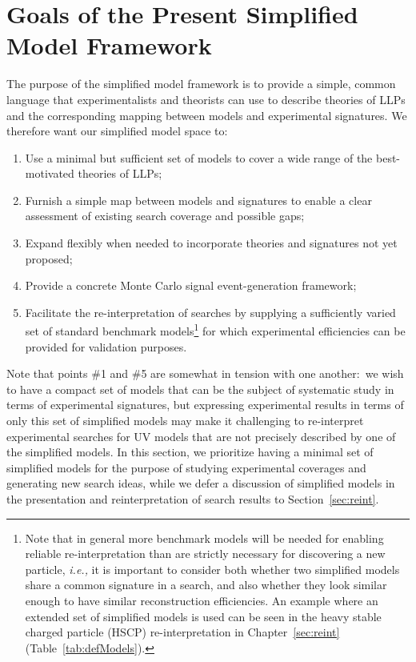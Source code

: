 \section{Goals of the Present Simplified Model Framework}\label{sec:goals}

The purpose of the simplified model framework is to provide a simple, common language that experimentalists and theorists can use to describe theories of LLPs and the corresponding mapping between models and experimental signatures. We therefore want our simplified model space to:
%
\begin{enumerate}
%
\item  Use a minimal but sufficient set of models to cover a wide range of the best-motivated theories of LLPs;
\item  Furnish a simple map between models and signatures to enable a clear assessment of existing search coverage and possible gaps; 
\item Expand flexibly when needed to incorporate theories and signatures not yet proposed;
\item Provide a concrete Monte Carlo signal event-generation framework;
\item Facilitate the re-interpretation of searches by supplying a sufficiently varied set of standard benchmark models\footnote{Note that in general more benchmark models will be needed for enabling reliable re-interpretation than are strictly necessary for discovering a new particle, \emph{i.e.,}  it is important to consider both whether two simplified models share a common signature in a search, and also whether they look similar enough to have similar reconstruction efficiencies. An example where an extended set of simplified models is used can be seen in the heavy stable charged particle (HSCP) re-interpretation in Chapter~\ref{sec:reint} (Table~\ref{tab:defModels}). } for which experimental efficiencies can be provided for validation purposes.
\end{enumerate}
%
Note that points \#1 and \#5 are somewhat in tension with one another:~we wish to have a compact set of models that can be the subject of systematic study in terms of experimental signatures, but expressing experimental results in terms of only this set of simplified models may make it challenging to re-interpret experimental searches for UV models that are not precisely described by one of the simplified models. In this section, we prioritize having a minimal set of simplified models for the purpose of studying experimental coverages and generating new search ideas, while we defer a discussion of simplified models in the presentation and reinterpretation of search results to Section~\ref{sec:reint}.

